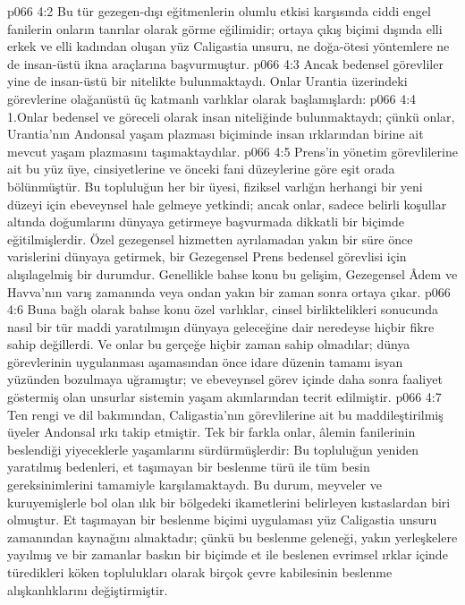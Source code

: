 \vs p066 4:2 Bu tür gezegen\hyp{}dışı eğitmenlerin olumlu etkisi karşısında ciddi engel fanilerin onların tanrılar olarak görme eğilimidir; ortaya çıkış biçimi dışında elli erkek ve elli kadından oluşan yüz Caligastia unsuru, ne doğa\hyp{}ötesi yöntemlere ne de insan\hyp{}üstü ikna araçlarına başvurmuştur.
\vs p066 4:3 Ancak bedensel görevliler yine de insan\hyp{}üstü bir nitelikte bulunmaktaydı. Onlar Urantia üzerindeki görevlerine olağanüstü üç katmanlı varlıklar olarak başlamışlardı:
\vs p066 4:4 1.\bibnobreakspace Onlar bedensel ve göreceli olarak insan niteliğinde bulunmaktaydı; çünkü onlar, Urantia’nın Andonsal yaşam plazması biçiminde insan ırklarından birine ait mevcut yaşam plazmasını taşımaktaydılar.
\vs p066 4:5 Prens’in yönetim görevlilerine ait bu yüz üye, cinsiyetlerine ve önceki fani düzeylerine göre eşit orada bölünmüştür. Bu topluluğun her bir üyesi, fiziksel varlığın herhangi bir yeni düzeyi için ebeveynsel hale gelmeye yetkindi; ancak onlar, sadece belirli koşullar altında doğumlarını dünyaya getirmeye başvurmada dikkatli bir biçimde eğitilmişlerdir. Özel gezegensel hizmetten ayrılamadan yakın bir süre önce varislerini dünyaya getirmek, bir Gezegensel Prens bedensel görevlisi için alışılagelmiş bir durumdur. Genellikle bahse konu bu gelişim, Gezegensel Âdem ve Havva’nın varış zamanında veya ondan yakın bir zaman sonra ortaya çıkar.
\vs p066 4:6 Buna bağlı olarak bahse konu özel varlıklar, cinsel birliktelikleri sonucunda nasıl bir tür maddi yaratılmışın dünyaya geleceğine dair neredeyse hiçbir fikre sahip değillerdi. Ve onlar bu gerçeğe hiçbir zaman sahip olmadılar; dünya görevlerinin uygulanması aşamasından önce idare düzenin tamamı isyan yüzünden bozulmaya uğramıştır; ve ebeveynsel görev içinde daha sonra faaliyet göstermiş olan unsurlar sistemin yaşam akımlarından tecrit edilmiştir.
\vs p066 4:7 Ten rengi ve dil bakımından, Caligastia’nın görevlilerine ait bu maddileştirilmiş üyeler Andonsal ırkı takip etmiştir. Tek bir farkla onlar, âlemin fanilerinin beslendiği yiyeceklerle yaşamlarını sürdürmüşlerdir: Bu topluluğun yeniden yaratılmış bedenleri, et taşımayan bir beslenme türü ile tüm besin gereksinimlerini tamamiyle karşılamaktaydı. Bu durum, meyveler ve kuruyemişlerle bol olan ılık bir bölgedeki ikametlerini belirleyen kıstaslardan biri olmuştur. Et taşımayan bir beslenme biçimi uygulaması yüz Caligastia unsuru zamanından kaynağını almaktadır; çünkü bu beslenme geleneği, yakın yerleşkelere yayılmış ve bir zamanlar baskın bir biçimde et ile beslenen evrimsel ırklar içinde türedikleri köken toplulukları olarak birçok çevre kabilesinin beslenme alışkanlıklarını değiştirmiştir.

